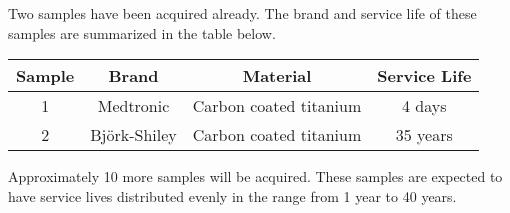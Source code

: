 Two samples have been acquired already. The brand and service life of these samples are summarized in the table below.\\
\begin{center}
    \begin{tabular}{|c|c|c|c|}
        \hline
        Sample & Brand & Material & Service Life\\
        \hline
        1 & Medtronic & Carbon coated titanium & 4 days \\
        \hline
        2 & Björk-Shiley & Carbon coated titanium & 35 years \\
        \hline
    \end{tabular}
\end{center}

Approximately 10 more samples will be acquired. These samples are expected to have service lives distributed evenly in the range from 1 year to 40 years.
